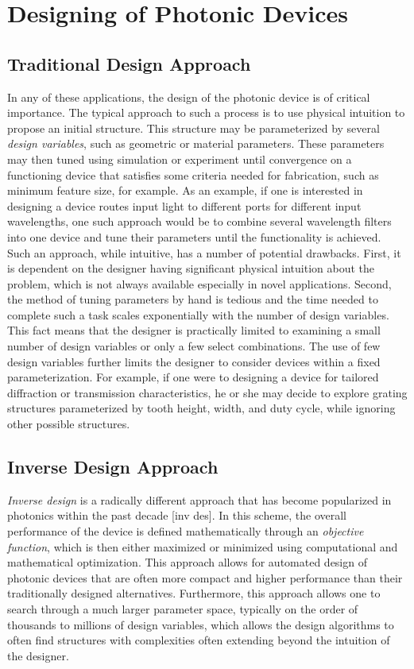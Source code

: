 \section{Designing of Photonic Devices}

\subsection{Traditional Design Approach}

In any of these applications, the design of the photonic device is of critical importance.
The typical approach to such a process is to use physical intuition to propose an initial structure.
This structure may be parameterized by several \textit{design variables}, such as geometric or material parameters.
These parameters may then tuned using simulation or experiment until convergence on a functioning device that satisfies some criteria needed for fabrication, such as minimum feature size, for example.
As an example, if one is interested in designing a device routes input light to different ports for different input wavelengths, one such approach would be to combine several wavelength filters into one device and tune their parameters until the functionality is achieved.
Such an approach, while intuitive, has a number of potential drawbacks.
First, it is dependent on the designer having significant physical intuition about the problem, which is not always available especially in novel applications.
Second, the method of tuning parameters by hand is tedious and the time needed to complete such a task scales exponentially with the number of design variables.
This fact means that the designer is practically limited to examining a small number of design variables or only a few select combinations.
The use of few design variables further limits the designer to consider devices within a fixed parameterization.
For example, if one were to designing a device for tailored diffraction or transmission characteristics, he or she may decide to explore grating structures parameterized by tooth height, width, and duty cycle, while ignoring other possible structures.


\subsection{Inverse Design Approach}

\textit{Inverse design} is a radically different approach that has become popularized in photonics within the past decade [inv des].  
In this scheme, the overall performance of the device is defined mathematically through an \textit{objective function}, which is then either maximized or minimized using computational and mathematical optimization.
This approach allows for automated design of photonic devices that are often more compact and higher performance than their traditionally designed alternatives.
Furthermore, this approach allows one to search through a much larger parameter space, typically on the order of thousands to millions of design variables, which allows the design algorithms to often find structures with complexities often extending beyond the intuition of the designer.

